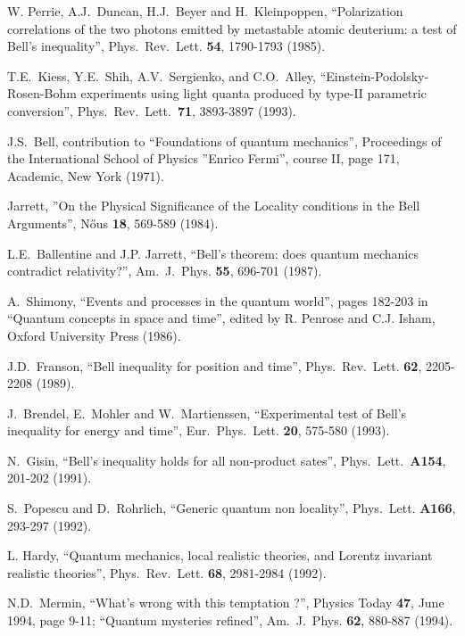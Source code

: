 \documentclass[12pt,onecolumn]{article}%
\begin{document}
\begin{thebibliography}{999}
W. Perrie, A.J.\ Duncan, H.J.\ Beyer and
H.\ Kleinpoppen, ``Polarization correlations of the two photons emitted by
metastable atomic deuterium: a test of Bell's inequality'', Phys.\ Rev.\ Lett.
\textbf{54}, 1790-1793 (1985).

T.E.\ Kiess, Y.E.\ Shih, A.V.\ Sergienko, and
C.O.\ Alley, ``Einstein-Podolsky-Rosen-Bohm experiments using light quanta
produced by type-II parametric conversion'', Phys.\ Rev.\ Lett.\ \textbf{71},
3893-3897 (1993).

J.S.\ Bell, contribution to ``Foundations of quantum
mechanics'', Proceedings of the International School of Physics ''Enrico
Fermi'', course II, page 171, Academic, New York (1971).

Jarrett, ''On the Physical Significance of the Locality
conditions in the Bell Arguments'', N\H{o}us \textbf{18}, 569-589 (1984).

L.E.\ Ballentine and J.P. Jarrett, ``Bell's
theorem: does quantum mechanics contradict relativity?'', Am.\ J.\ Phys.
\textbf{55}, 696-701 (1987).

A.\ Shimony, ``Events and processes in the quantum
world'', pages 182-203 in ``Quantum concepts in space and time'', edited by R.
Penrose and C.J. Isham, Oxford University Press (1986).

J.D.\ Franson, ``Bell inequality for position and time'',
Phys.\ Rev.\ Lett. \textbf{62}, 2205-2208 (1989).

J.\ Brendel, E.\ Mohler and W.\ Martienssen, ``Experimental
test of Bell's inequality for energy and time'', Eur.\ Phys.\ Lett.
\textbf{20}, 575-580 (1993).

N.\ Gisin, ``Bell's inequality holds for all non-product
sates'', Phys.\ Lett.\ \textbf{A154}, 201-202 (1991).

S.\ Popescu and D.\ Rohrlich, ``Generic quantum non
locality'', Phys.\ Lett. \textbf{A166}, 293-297 (1992).

L. Hardy, ``Quantum mechanics, local realistic theories, and
Lorentz invariant realistic theories'', Phys.\ Rev.\ Lett. \textbf{68},
2981-2984 (1992).

N.D.\ Mermin, ``What's wrong with this temptation ?'',
Physics Today \textbf{47}, June 1994, page 9-11; ``Quantum mysteries
refined'', Am.\ J.\ Phys. \textbf{62}, 880-887 (1994).


\end{thebibliography}
\end{document}
